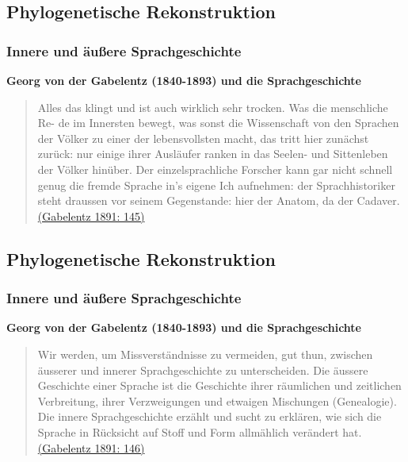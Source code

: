\subsection{\texorpdfstring{{Phylogenetische
Rekonstruktion}}{Phylogenetische Rekonstruktion}}

\subsubsection{\texorpdfstring{{Innere und äußere
Sprachgeschichte}}{Innere und äußere Sprachgeschichte}}

\textbf{Georg von der Gabelentz (1840-1893) und die Sprachgeschichte}

\begin{quote}
Alles das klingt und ist auch wirklich sehr trocken. Was die menschliche
Re- de im Innersten bewegt, was sonst die Wissenschaft von den Sprachen
der Völker zu einer der lebensvollsten macht, das tritt hier zunächst
zurück: nur einige ihrer Ausläufer ranken in das Seelen- und Sittenleben
der Völker hinüber. Der einzelsprachliche Forscher kann gar nicht
schnell genug die fremde Sprache in's eigene Ich aufnehmen: der
Sprachhistoriker steht draussen vor seinem Gegenstande: hier der Anatom,
da der Cadaver.
\href{http://bibliography.lingpy.org?key=Gabelentz1891}{(Gabelentz 1891:
145)}
\end{quote}

\subsection{\texorpdfstring{{Phylogenetische
Rekonstruktion}}{Phylogenetische Rekonstruktion}}

\subsubsection{\texorpdfstring{{Innere und äußere
Sprachgeschichte}}{Innere und äußere Sprachgeschichte}}

\textbf{Georg von der Gabelentz (1840-1893) und die Sprachgeschichte}

\begin{quote}
Wir werden, um Missverständnisse zu vermeiden, gut thun, zwischen
äusserer und innerer Sprachgeschichte zu unterscheiden. Die äussere
Geschichte einer Sprache ist die Geschichte ihrer räumlichen und
zeitlichen Verbreitung, ihrer Verzweigungen und etwaigen Mischungen
(Genealogie). Die innere Sprachgeschichte erzählt und sucht zu erklären,
wie sich die Sprache in Rücksicht auf Stoff und Form allmählich
verändert hat.
\href{http://bibliography.lingpy.org?key=Gabelentz1891}{(Gabelentz 1891:
146)}
\end{quote}


